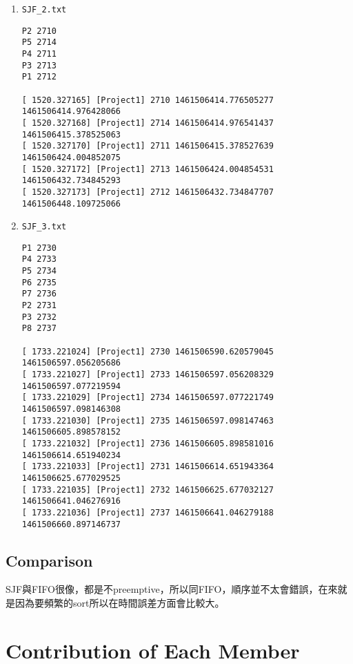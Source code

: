 \documentclass{article}
\begin{document}
\begin{CJK}{UTF8}{bkai}
\begin{enumerate}
\begin{verbatim}
[ 1331.110283] [Project1] 2558 1461506228.616022414 1461506232.915866507
[ 1331.110286] [Project1] 2559 1461506232.915868797 1461506235.073549386
[ 1331.110288] [Project1] 2560 1461506235.073552214 1461506243.838296353
[ 1331.110290] [Project1] 2557 1461506243.838298302 1461506258.987460851
\end{verbatim}
\item \texttt{SJF\_2.txt}
\begin{verbatim}
P2 2710
P5 2714
P4 2711
P3 2713
P1 2712

[ 1520.327165] [Project1] 2710 1461506414.776505277 1461506414.976428066
[ 1520.327168] [Project1] 2714 1461506414.976541437 1461506415.378525063
[ 1520.327170] [Project1] 2711 1461506415.378527639 1461506424.004852075
[ 1520.327172] [Project1] 2713 1461506424.004854531 1461506432.734845293
[ 1520.327173] [Project1] 2712 1461506432.734847707 1461506448.109725066
\end{verbatim}
\item \texttt{SJF\_3.txt}
\begin{verbatim}
P1 2730
P4 2733
P5 2734
P6 2735
P7 2736
P2 2731
P3 2732
P8 2737

[ 1733.221024] [Project1] 2730 1461506590.620579045 1461506597.056205686
[ 1733.221027] [Project1] 2733 1461506597.056208329 1461506597.077219594
[ 1733.221029] [Project1] 2734 1461506597.077221749 1461506597.098146308
[ 1733.221030] [Project1] 2735 1461506597.098147463 1461506605.898578152
[ 1733.221032] [Project1] 2736 1461506605.898581016 1461506614.651940234
[ 1733.221033] [Project1] 2731 1461506614.651943364 1461506625.677029525
[ 1733.221035] [Project1] 2732 1461506625.677032127 1461506641.046276916
[ 1733.221036] [Project1] 2737 1461506641.046279188 1461506660.897146737
\end{verbatim}
\end{enumerate}

\subsection{Comparison}
SJF與FIFO很像，都是不preemptive，所以同FIFO，順序並不太會錯誤，在來就是因為要頻繁的sort所以在時間誤差方面會比較大。

\section{Contribution of Each Member}

\end{CJK}
\end{document}

